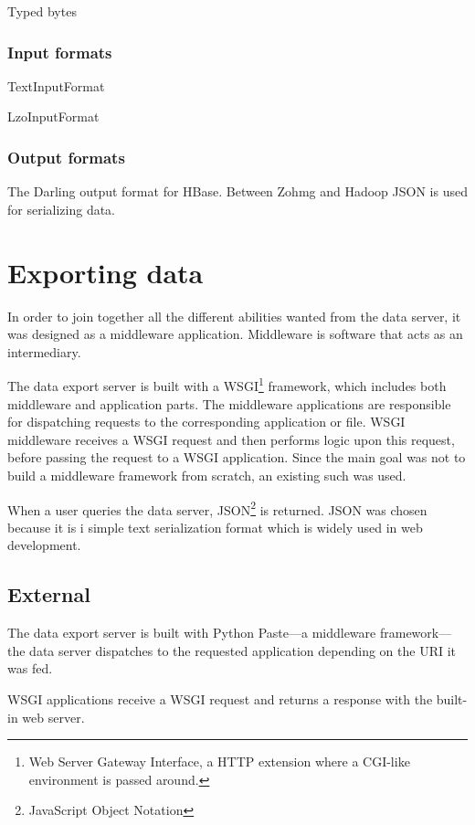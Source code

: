 Typed bytes


\subsubsection{Input formats}

TextInputFormat

LzoInputFormat


\subsubsection{Output formats}

The Darling output format for HBase. Between Zohmg and Hadoop JSON is used
for serializing data.


\section{Exporting data}

In order to join together all the different abilities wanted from the data
server, it was designed as a middleware application. Middleware is software
that acts as an intermediary.

The data export server is built with a WSGI\footnote{Web Server Gateway
Interface, a HTTP extension where a CGI-like environment is passed around.}
framework, which includes both middleware and application parts. The middleware
applications are responsible for dispatching requests to the corresponding
application or file.
WSGI middleware receives a
WSGI request and then performs logic upon this request, before passing the
request to a WSGI application. \cite{definitive_guide_to_pylons,paste}
Since the main goal was not
to build a middleware framework from scratch, an existing such was used.


When a user queries the data server, JSON\footnote{JavaScript Object Notation}
is returned. JSON was chosen because it is i simple text serialization format
which is widely used in web development.

\subsection{External}

The data export server is built with Python Paste---a middleware
framework---the data server dispatches to the requested application
depending on the URI it was fed. \cite{python_paste}

WSGI applications receive a WSGI request and returns a response with the
built-in web server.



